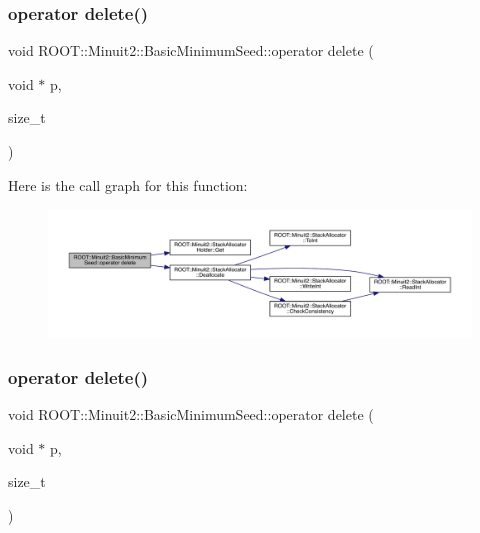 \subsubsection{\texorpdfstring{operator delete()}{operator delete()}\hspace{0.1cm}{\footnotesize\ttfamily [1/2]}}
{\footnotesize\ttfamily void R\+O\+O\+T\+::\+Minuit2\+::\+Basic\+Minimum\+Seed\+::operator delete (\begin{DoxyParamCaption}\item[{void $\ast$}]{p,  }\item[{size\+\_\+t}]{ }\end{DoxyParamCaption})\hspace{0.3cm}{\ttfamily [inline]}}

Here is the call graph for this function\+:
\nopagebreak
\begin{figure}[H]
\begin{center}
\leavevmode
\includegraphics[width=350pt]{de/d50/classROOT_1_1Minuit2_1_1BasicMinimumSeed_ae2af98f9f03cfe5e5202153b914ff120_cgraph}
\end{center}
\end{figure}
\mbox{\label{classROOT_1_1Minuit2_1_1BasicMinimumSeed_ae2af98f9f03cfe5e5202153b914ff120}} 
\subsubsection{\texorpdfstring{operator delete()}{operator delete()}\hspace{0.1cm}{\footnotesize\ttfamily [2/2]}}
{\footnotesize\ttfamily void R\+O\+O\+T\+::\+Minuit2\+::\+Basic\+Minimum\+Seed\+::operator delete (\begin{DoxyParamCaption}\item[{void $\ast$}]{p,  }\item[{size\+\_\+t}]{ }\end{DoxyParamCaption})\hspace{0.3cm}{\ttfamily [inline]}}

